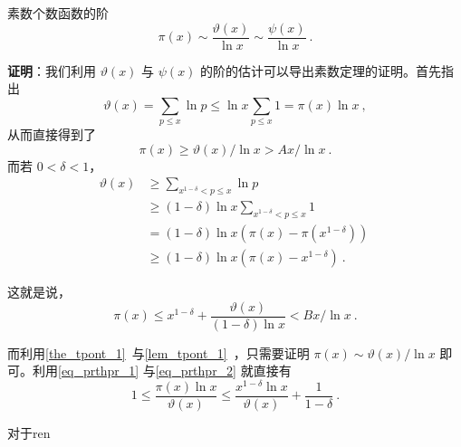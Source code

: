 

\begin{theorem}{素数个数函数的阶}
\begin{equation}
\pi(x) \sim \frac{\vartheta(x)}{\ln x} \sim \frac{\psi(x)}{\ln x} ~.
\end{equation}

\end{theorem}
\textbf{证明}：我们利用 $\vartheta(x)$ 与 $\psi(x)$ 的阶的估计可以导出素数定理的证明。首先指出
\begin{equation}
\vartheta(x) = \sum_{p \le x} \ln p \le \ln x \sum_{p \le x} 1 = \pi(x) \ln x ~,
\end{equation}
从而直接得到了
\begin{equation}\label{eq_prthpr_1}
\pi(x) \ge \vartheta(x)/\ln x > Ax / \ln x ~.
\end{equation}
而若 $0 < \delta < 1$，
\begin{equation}
\begin{aligned}
\vartheta(x) &\ge \sum_{x^{1-\delta} < p \le x} \ln p ~\\
&\ge (1-\delta) \ln x \sum_{x^{1-\delta} < p \le x} 1 ~\\
&= (1-\delta) \ln x \left( \pi(x) - \pi(x^{1-\delta}) \right) ~\\
&\ge (1-\delta) \ln x \left( \pi(x) - x^{1-\delta} \right) ~.
\end{aligned}
\end{equation}

这就是说，
\begin{equation}\label{eq_prthpr_2}
\pi(x) \le x^{1-\delta} + \frac{\vartheta(x)}{(1-\delta) \ln x} < Bx/\ln x ~.
\end{equation}

而利用\autoref{the_tpont_1}~与\autoref{lem_tpont_1}~，只需要证明 $\pi(x) \sim \vartheta(x)/\ln x$ 即可。利用\autoref{eq_prthpr_1} 与\autoref{eq_prthpr_2} 就直接有
\begin{equation}
1 \le \frac{\pi(x) \ln x}{\vartheta(x)} \le \frac{x^{1-\delta} \ln x}{\vartheta(x)} + \frac{1}{1-\delta} ~.
\end{equation}

对于ren




